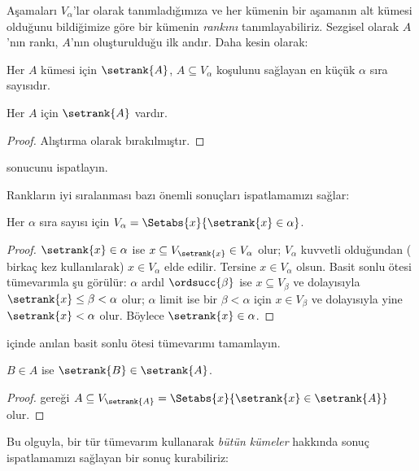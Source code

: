\documentclass[../../../include/open-logic-section]{subfiles}
\begin{document}

Aşamaları $V_\alpha$'lar olarak tanımladığımıza ve her kümenin bir aşamanın
alt kümesi olduğunu bildiğimize göre bir kümenin \emph{rankını}
tanımlayabiliriz. Sezgisel olarak $A$'nın rankı, $A$'nın oluşturulduğu ilk
andır. Daha kesin olarak:

\begin{defn}
Her $A$ kümesi için $\setrank{A}$, $A\subseteq V_\alpha$ koşulunu sağlayan
en küçük $\alpha$ sıra sayısıdır.
\end{defn}
\begin{prop}
	Her $A$ için $\setrank{A}$ vardır.
\end{prop}
\begin{proof}
	Alıştırma olarak bırakılmıştır.
\end{proof}
\begin{prob}
	 sonucunu ispatlayın.
\end{prob}
\noindent
Rankların iyi sıralanması bazı önemli sonuçları ispatlamamızı sağlar:
\begin{prop}
Her $\alpha$ sıra sayısı için
$V_\alpha=\Setabs{x}{\setrank{x}\in\alpha}$.
\end{prop}

\begin{proof}
$\setrank{x}\in\alpha$ ise
$x\subseteq V_{\setrank{x}}\in V_\alpha$ olur; $V_\alpha$ kuvvetli
olduğundan ( birkaç kez kullanılarak)
$x\in V_\alpha$ elde edilir. Tersine $x\in V_\alpha$ olsun. Basit sonlu
ötesi tümevarımla şu görülür: $\alpha$ ardıl $\ordsucc{\beta}$ ise
$x\subseteq V_\beta$ ve dolayısıyla $\setrank{x}\leq\beta<\alpha$ olur;
$\alpha$ limit ise bir $\beta<\alpha$ için $x\in V_\beta$ ve dolayısıyla
yine $\setrank{x}<\alpha$ olur. Böylece $\setrank{x}\in\alpha$.
\end{proof}
\begin{prob}
	 içinde anılan basit sonlu ötesi
	tümevarımı tamamlayın.
\end{prob}

\begin{prop}
$B\in A$ ise $\setrank{B}\in\setrank{A}$.
\end{prop}

\begin{proof}
 gereği
$A\subseteq V_{\setrank{A}}=
\Setabs{x}{\setrank{x}\in\setrank{A}}$ olur.
\end{proof}
\noindent
Bu olguyla, bir tür tümevarım kullanarak \emph{bütün kümeler} hakkında
sonuç ispatlamamızı sağlayan bir sonuç kurabiliriz:
\end{document}
